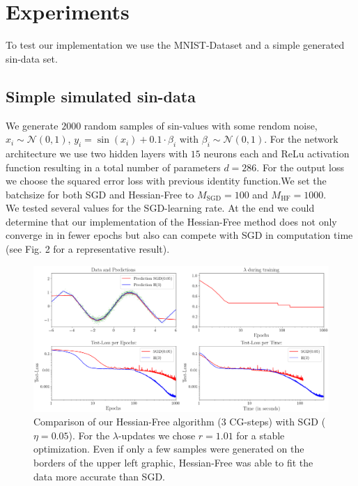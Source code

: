 \documentclass[conference]{IEEEtran}
\begin{document}
	
	\section{Experiments}
	\noindent
	To test our implementation we use the MNIST-Dataset and a simple generated sin-data set.
	
	\subsection{Simple simulated sin-data}
	\noindent
	We generate $2000$ random samples of sin-values with some rendom noise, $x_{i}\sim\mathcal{N}(0, 1)$, $y_{i}=\sin(x_{i})+0.1\cdot\beta_{i}$ with  $\beta_{i}\sim\mathcal{N}(0,1)$. For the network architecture we use two hidden layers with $15$ neurons each and ReLu activation function resulting in a total number of parameters $d=286$. For the output loss we choose the squared error loss with previous identity function.We set the batchsize for both SGD and Hessian-Free to $M_{\mathrm{SGD}}=100$ and $M_{\mathrm{HF}}=1000$.\\
	We tested several values for the SGD-learning rate. At the end we could determine that our implementation of the Hessian-Free method does not only converge in in fewer epochs but also can compete with SGD in computation time (see Fig. 2 for a representative result).
	
	
	\begin{figure}[tb]
		\centering
		\includegraphics[width=\textwidth]{toy_005.png}
		\caption{Comparison of our Hessian-Free algorithm (3 CG-steps) with SGD ($\eta=0.05$). For the $\lambda$-updates we chose $r=1.01$ for a stable optimization. Even if only a few samples were generated on the borders of the upper left graphic, Hessian-Free was able to fit the data more accurate than SGD.}
		\label{fig2}
	\end{figure}
	
\end{document}
